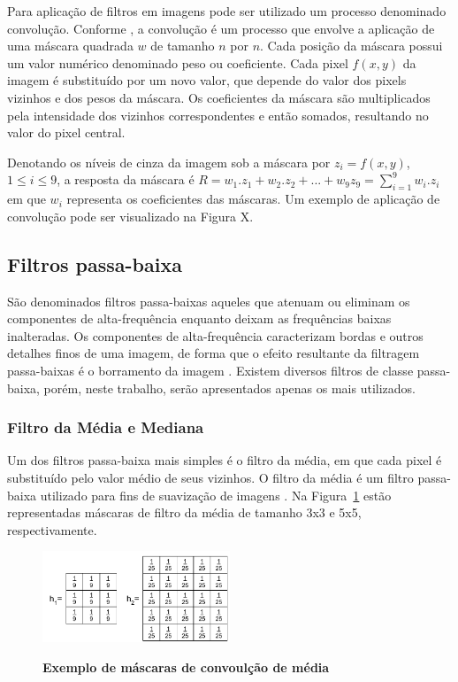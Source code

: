 \documentclass[12pt,oneside,a4paper,english,french,spanish,brazil,]{abntex2}
\begin{document}
Para aplicação de filtros em imagens pode ser utilizado um processo denominado convolução. Conforme \cite{pedrini:2008}, a convolução é um processo que envolve a aplicação de uma máscara quadrada \(w\) de tamanho \(n\) por \(n\). Cada posição da máscara possui um valor numérico denominado peso ou coeficiente. Cada pixel \(f(x,y)\) da imagem é substituído por um novo valor, que depende do valor dos pixels vizinhos e dos pesos da máscara. Os coeficientes da máscara são multiplicados pela intensidade dos vizinhos correspondentes e então somados, resultando no valor do pixel central.


Denotando os níveis de cinza da imagem sob a máscara por \(z_i=f(x,y)\), \(1\leq i\leq 9\), a resposta da máscara é \(R=w_1.z_1+w_2.z_2+...+w_9z_9 = \sum_{i=1}^{9}w_i.z_i\) em que \(w_i\) representa os coeficientes das máscaras. Um exemplo de aplicação de convolução pode ser visualizado na Figura X.
	

\subsection{Filtros passa-baixa}

São denominados filtros passa-baixas aqueles que atenuam ou eliminam os componentes de alta-frequência enquanto deixam as frequências baixas inalteradas. Os componentes de alta-frequência caracterizam bordas e outros detalhes finos de uma imagem, de forma que o efeito resultante da filtragem passa-baixas é o borramento da imagem \cite{gonzalez:2012}. Existem diversos filtros de classe passa-baixa, porém, neste trabalho, serão apresentados apenas os mais utilizados.

\subsubsection{Filtro da Média e Mediana}

Um dos filtros passa-baixa mais simples é o filtro da média, em que cada pixel é substituído pelo valor médio de seus vizinhos. O filtro da média é um filtro passa-baixa utilizado para fins de suavização de imagens \cite{pedrini:2008}. Na Figura~\ref{fig:PDI_Mascara_Media} estão representadas máscaras de filtro da média de tamanho 3x3 e 5x5, respectivamente.

\begin{figure}[ht]
\centering
\caption{\textbf{Exemplo de máscaras de convoulção de média}}
\includegraphics[width=0.5\textwidth]{imagens/PDI_Mascara_Media.pdf}
\label{fig:PDI_Mascara_Media}
\end{figure}
\end{document}

